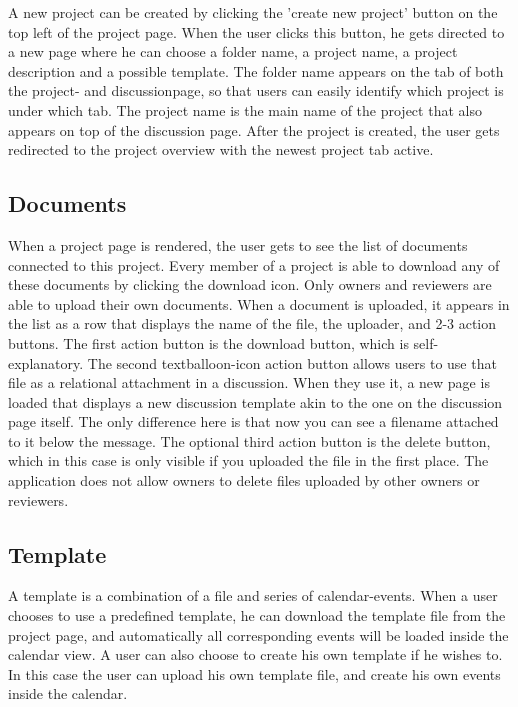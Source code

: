 A new project can be created by clicking the 'create new project' button on the top left of the project page. When the user clicks this button,
he gets directed to a new page where he can choose a folder name, a project name, a project description and a possible template. The folder name
appears on the tab of both the project- and discussionpage, so that users can easily identify which project is under which tab. The project
name is the main name of the project that also appears on top of the discussion page. After the project is created, the user gets redirected
to the project overview with the newest project tab active.

\subsection{Documents}

When a project page is rendered, the user gets to see the list of documents connected to this project. Every member of a project is able to download
any of these documents by clicking the download icon. Only owners and reviewers are able to upload their own documents. When a document is uploaded,
it appears in the list as a row that displays the name of the file, the uploader, and 2-3 action buttons. The first action button is the download 
button, which is self-explanatory. The second textballoon-icon action button allows users to use that file as a relational attachment in a discussion.
When they use it, a new page is loaded that displays a new discussion template akin to the one on the discussion page itself. The only difference here
is that now you can see a filename attached to it below the message. The optional third action button is the delete button, which in this case is
only visible if you uploaded the file in the first place. The application does not allow owners to delete files uploaded by other owners or reviewers.

\subsection{Template}

A template is a combination of a file and series of calendar-events. When a user chooses to use a predefined template, he can download the template file
from the project page, and automatically all corresponding events will be loaded inside the calendar view. A user can also choose to create his own 
template if he wishes to. In this case the user can upload his own template file, and create his own events inside the calendar.

